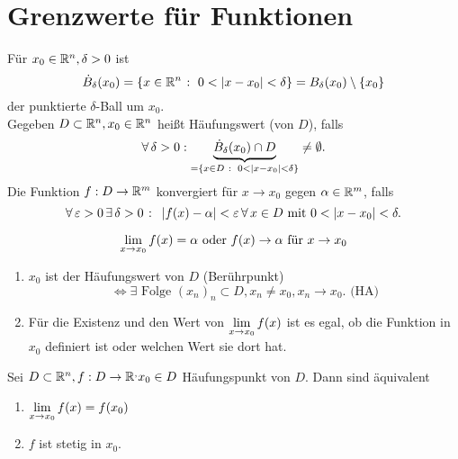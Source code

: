 \documentclass[../ana1.tex]{subfiles}
\begin{document}
\setcounter{section}{15}
\section{Grenzwerte für Funktionen}
\begin{defi}
    Für \( x_0 \in \mathbb{R}^n, \delta > 0 \) ist
    \[ \dot{B}_\delta(x_0) = \{ x \in \mathbb{R}^n \;\colon \; 
    0 < \left|x-x_0\right| < \delta \} = B_\delta (x_0) \setminus 
    \{x_0\} \]
    der punktierte \( \delta \)-Ball um \( x_0 \).\\
    Gegeben \( D \subset \mathbb{R}^n, x_0 \in \mathbb{R}^n \) heißt 
    Häufungswert (von \( D \)), falls 
    \[ \forall \, \delta > 0 : \underbrace{ 
    \dot{B}_\delta(x_0) \cap D}_{ = \{ x\in D \;\colon \;
    0 < \left| x - x_0 \right| < \delta \} } \neq \emptyset. \]
    Die Funktion \( f: D\rightarrow \mathbb{R}^m \) konvergiert für 
    \( x\rightarrow x_0 \) gegen \( \alpha \in \mathbb{R}^m \), falls
    \[ \forall \,\varepsilon > 0 \,\exists \, \delta > 0 
    \;\colon \; \left| f(x) - \alpha \right| < \varepsilon \,\forall \, 
    x \in D\text{ mit } 0 < \left|x-x_0\right| < \delta. \]
\end{defi}
\begin{notation}
    \[ \lim\limits_{x\rightarrow x_0} f(x) = \alpha \text{ oder } f(x) 
    \rightarrow \alpha \text{ für } x\rightarrow x_0 \]
\end{notation}
\begin{bem}
    \begin{enumerate}
        \item \( x_0 \) ist der Häufungswert von \( D \) (Berührpunkt)
        \[ \Leftrightarrow \exists \text{ Folge } {(x_n)}_n \subset D, 
        x_n \neq x_0, x_n \rightarrow x_0. \text{ (HA)} \]
        \item Für die Existenz und den Wert von \( \lim\limits_{x\rightarrow x_0} f(x) \)
        ist es egal, ob die Funktion in \( x_0 \) definiert ist oder welchen 
        Wert sie dort hat.

    \end{enumerate}
\end{bem}
\begin{lem}
    Sei \( D \subset \mathbb{R}^n, f : D \rightarrow \mathbb{R}^, x_0 \in D \) 
    Häufungspunkt von \(D\). Dann sind äquivalent
    \begin{enumerate}
        \item \( \lim\limits_{x\rightarrow x_0} f(x) = f(x_0) \)
        \item \( f \) ist stetig in \( x_0 \).
    \end{enumerate}
\end{lem}
\end{document}
